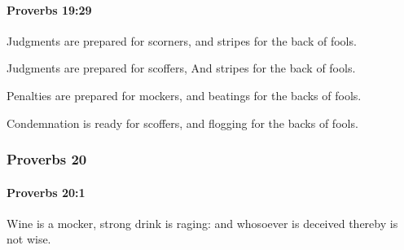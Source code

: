 		\paragraph{Proverbs 19:29} %
			\label{PROVERBS-19-29}

			Judgments are prepared for scorners, and stripes for the back of fools.

			\begin{versebox}
					\item[BHS] 
					\item[ASV] Judgments are prepared for scoffers, And stripes for the back of fools.
					\item[NIV] Penalties are prepared for mockers, and beatings for the backs of fools.
					\item[NRSV] Condemnation is ready for scoffers, and flogging for the backs of fools.
			\end{versebox}
	\subsubsection{Proverbs 20} %
		\label{PROVERBS-20}

		\paragraph{Proverbs 20:1} %
			\label{PROVERBS-20-1}

			Wine is a mocker, strong drink is raging: and whosoever is deceived thereby is not wise.

